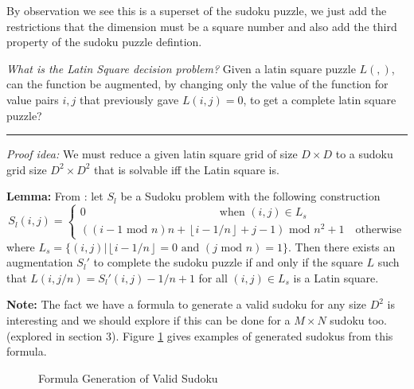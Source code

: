 \documentclass[a4paper,11pt]{report}
\newcounter{row}
\newcounter{col}
\newcounter{rowa}
\newcounter{cola}
\newcommand\setrow[9]{
  \setcounter{col}{1}
  \foreach \n in {#1, #2, #3, #4, #5, #6, #7, #8, #9} {
    \edef\x{\value{col} - 0.5}
    \edef\y{9.5 - \value{row}}
    \node[anchor=center] at (\x, \y) {\n};
    \stepcounter{col}
  }
  \stepcounter{row}
}
\newcommand\setrowa[4]{
  \setcounter{cola}{1}
  \foreach \n in {#1, #2, #3, #4} {
    \edef\x{\value{cola} - 0.5}
    \edef\y{4.5 - \value{rowa}}
    \node[anchor=center] at (\x, \y) {\n};
    \stepcounter{cola}
  }
  \stepcounter{rowa}
}
\begin{document}
By observation we see this is a superset of the sudoku puzzle, we just add the restrictions that the dimension must be a square number and also add the third property of the sudoku puzzle defintion.

\textit{What is the Latin Square decision problem?} Given a latin square puzzle $L(,)$, can the function be augmented, by changing only the value of the function for value pairs $i,j$ that previously gave $L(i,j) =0$, to get a complete latin square puzzle?

\noindent\rule{4cm}{0.4pt}

\textit{Proof idea:} We must reduce a given latin square grid of size $D \times D$ to a sudoku grid size $D^2 \times D^2$ that is solvable iff the Latin square is.

\textbf{Lemma:} From \cite{sls}: let $S_l$ be a Sudoku problem with the following construction 
\begin{equation}
	S_l(i,j) =\begin{cases}
0 \qquad\qquad\qquad\qquad\qquad\qquad\text{when } (i,j) \in L_s \\ 
((i-1 \text{ mod } n)n + \left\lfloor{i-1/n}\right\rfloor+j-1)\text{ mod } n^2 +1 \quad\text{otherwise}
\end{cases}
\end{equation}
where $L_s=\{(i,j)| \left\lfloor{i-1/n}\right\rfloor=0 \text{ and }(j \text{ mod }n)=1\}$. Then there exists an augmentation $S_l'$ to complete the sudoku puzzle if and only if the square $L$ such that $L(i,j/n)=S_l'(i,j)-1/n+1$ for all $(i,j) \in L_s$ is a Latin square.

\textbf{Note:} The fact we have a formula to generate a valid sudoku for any size $D^2$ is interesting and we should explore if this can be done for a $M\times N$ sudoku too. (explored in section 3). Figure \ref{formula} gives examples of generated sudokus from this formula.

\begin{figure}[h]
\centering
{}
\caption{Formula Generation of Valid Sudoku}
\label{formula}
\end{figure}
\end{document}
